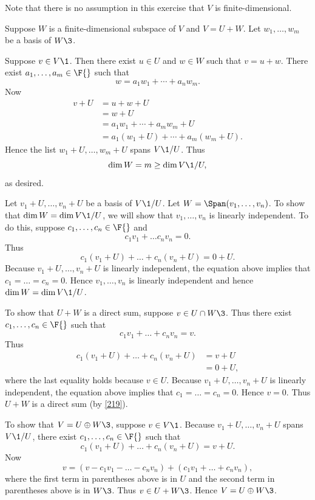 \begin{Solution}
Note that there is no assumption in this exercise that $V$ is finite-dimensional.

\begin{subtheorem}
\item
Suppose $W$ is a finite-dimensional subspace of $V$ and \mbox{$V = U + W$}. Let $w_1, \ldots, w_m$ be a basis of $W\3$.

Suppose $v \in V\1$. Then there exist $u \in U$ and $w \in W$ such that $v = u + w$. There exist $a_1, \ldots, a_m \in \F{}$ such that
\[
w = a_1 w_1 + \cdots + a_n w_m.
\]
Now
\begin{align*}
v + U &= u + w + U \\
&= w + U \\
&= a_1 w_1 + \cdots + a_m w_m + U\\
&= a_1(w_1 + U) + \cdots + a_m(w_m + U).
\end{align*}
Hence the list $w_1 + U, \ldots, w_m + U$ spans $V\1/U$. Thus
\[
\dim W = m \ge \dim V\1/U,
\]
as desired.

\item
Let $v_1 + U, \dots, v_n + U$ be a basis of $V\1/U$. Let $W = \Span(v_1, \dots, v_n)$. To show that
$\dim W = \dim V\1/U$, we will show that $v_1, \dots, v_n$ is linearly independent. To do this,
suppose $c_1, \dots, c_n \in \F{}$ and
\[
c_1 v_1 + \dots c_n v_n = 0.
\]
Thus
\[
c_1 (v_1 + U) + \dots + c_n(v_n + U) = 0 + U.
\]
Because $v_1 + U, \dots, v_n + U$ is linearly independent, the equation above implies that
$c_1 = \dots = c_n = 0$. Hence $v_1, \dots, v_n$ is linearly independent and hence $\dim W = \dim V\1/U$.

To show that $U + W$ is a direct sum, suppose $v \in U \cap W\3$. Thus there exist $c_1, \dots, c_n \in \F{}$ such that
\[
c_1 v_1 + \dots + c_n v_n = v.
\]
Thus
\begin{align*}
c_1 (v_1 + U) + \dots + c_n(v_n + U) &= v + U \\
&= 0 + U,
\end{align*}
where the last equality holds because $v \in U$. Because $v_1 + U, \dots, v_n + U$ is linearly independent, the equation above implies that
$c_1 = \dots = c_n = 0$. Hence $v = 0$. Thus $U + W$ is a direct sum (by \ref{219}).

To show that $V = U \oplus W\3$, suppose $v \in V\1$. Because $v_1 + U, \dots, v_n + U$ spans $V\1/U$, there exist $c_1, \dots, c_n \in \F{}$ such that
\[
c_1 (v_1 + U) + \dots + c_n(v_n + U) = v + U.
\]
Now
\[
v = (v - c_1 v_1 - \dots - c_n v_n) + (c_1 v_1 + \dots + c_n v_n),
\]
where the first term in parentheses above is in $U$ and the second term in parentheses above is in $W\3$. Thus $v \in U+ W\3$. Hence $V = U \oplus W\3$.
\end{subtheorem}
\end{Solution}

